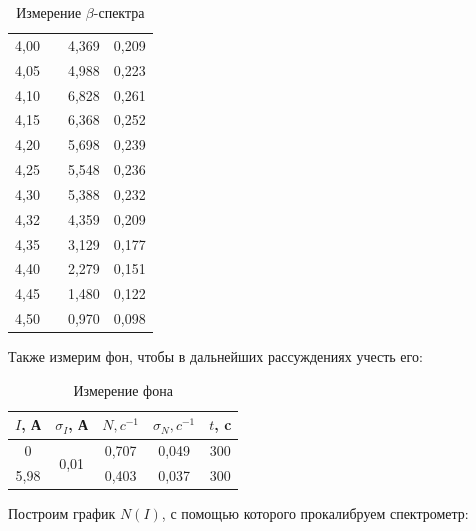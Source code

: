 \documentclass[a4paper,12pt]{report}
\begin{document}
\begin{table}[H]
\begin{tabular}{|c|c|c|c|}
4,00 &                        & 4,369        & 0,209             \\ \cline{1-1} \cline{3-4} 
4,05 &                        & 4,988        & 0,223             \\ \cline{1-1} \cline{3-4} 
4,10 &                        & 6,828        & 0,261             \\ \cline{1-1} \cline{3-4} 
4,15 &                        & 6,368        & 0,252             \\ \cline{1-1} \cline{3-4} 
4,20 &                        & 5,698        & 0,239             \\ \cline{1-1} \cline{3-4} 
4,25 &                        & 5,548        & 0,236             \\ \cline{1-1} \cline{3-4} 
4,30 &                        & 5,388        & 0,232             \\ \cline{1-1} \cline{3-4} 
4,32 &                        & 4,359        & 0,209             \\ \cline{1-1} \cline{3-4} 
4,35 &                        & 3,129        & 0,177             \\ \cline{1-1} \cline{3-4} 
4,40 &                        & 2,279        & 0,151             \\ \cline{1-1} \cline{3-4} 
4,45 &                        & 1,480        & 0,122             \\ \cline{1-1} \cline{3-4} 
4,50 &                        & 0,970        & 0,098             \\ \hline
\end{tabular}
\caption{Измерение $\beta$-спектра}
\end{table}

Также измерим фон, чтобы в дальнейших рассуждениях учесть его:

\begin{table}[H]
\begin{tabular}{|c|c|c|c|c|}
\hline
$I$, А & $\sigma_{I}$, А              & $N, c^{-1}$ & $\sigma_{N},c^{-1}$ & $t$, c \\ \hline
0    & \multirow{2}{*}{0,01} & 0,707        & 0,049             & 300  \\ \cline{1-1} \cline{3-5} 
5,98 &                       & 0,403        & 0,037             & 300  \\ \hline
\end{tabular}
\caption{Измерение фона}
\end{table}

Построим график $N(I)$, с помощью которого прокалибруем спектрометр:
\end{document}
